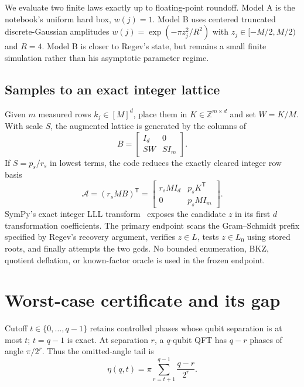 \documentclass[10pt,twocolumn]{article}
\newcommand{\Z}{\mathbb{Z}}
\newcommand{\Lz}{L_0}
\begin{document}
We evaluate two finite laws exactly up to floating-point roundoff.  Model A is
the notebook's uniform hard box, $w(j)=1$.  Model B uses centered truncated discrete-Gaussian
amplitudes $w(j)=\exp(-\pi z_j^2/R^2)$ with
$z_j\in[-M/2,M/2)$ and $R=4$.  Model B is closer to Regev's state, but remains
a small finite simulation rather than his asymptotic parameter regime.

\subsection{Samples to an exact integer lattice}

Given $m$ measured rows $k_j\in[M]^d$, place them in
$K\in\Z^{m\times d}$ and set $W=K/M$.  With scale $S$, the augmented lattice
is generated by the columns of
\begin{equation}
 B=\begin{bmatrix}I_d&0\\SW&SI_m\end{bmatrix}.
\end{equation}
If $S=p_s/r_s$ in lowest terms, the code reduces the exactly cleared integer
row basis
\begin{equation}
 \mathcal A=(r_s M B)^\mathsf{T}=
 \begin{bmatrix}r_sMI_d&p_sK^\mathsf{T}\\0&p_sMI_m\end{bmatrix}.
 \label{eq:augmented}
\end{equation}
SymPy's exact integer LLL transform~\cite{LenstraLenstraLovasz1982} exposes
the candidate $z$ in its first $d$ transformation coefficients.  The primary
endpoint scans the Gram--Schmidt prefix specified by Regev's recovery
argument, verifies $z\in L$, tests $z\in\Lz$ using stored roots, and finally
attempts the two gcds.  No bounded enumeration, BKZ, quotient deflation, or
known-factor oracle is used in the frozen endpoint.

\section{Worst-case certificate and its gap}

Cutoff $t\in\{0,\ldots,q-1\}$ retains controlled phases whose qubit
separation is at most $t$; $t=q-1$ is exact.  At separation $r$, a $q$-qubit
QFT has $q-r$ phases of angle $\pi/2^r$.  Thus the omitted-angle tail is
\begin{equation}
 \eta(q,t)=\pi\sum_{r=t+1}^{q-1}\frac{q-r}{2^r}.
 \label{eq:eta}
\end{equation}
\end{document}
